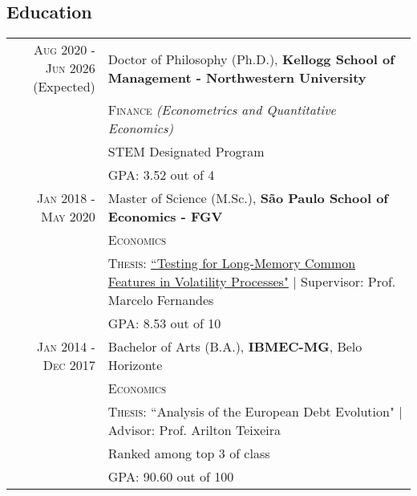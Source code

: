 \documentclass[a4paper,10pt]{article}
\begin{document}
\begin{samepage}
    \section{Education}
    \begin{tabular}{r|p{10.75cm}}
        \textsc{Aug} 2020 - \parbox[t]{1.5cm}{\centering \textsc{Jun} 2026\\ (Expected)} & Doctor of Philosophy (Ph.D.), \normalsize\textbf{Kellogg School of Management - Northwestern University} \\
        & \textsc{Finance} \textit{(Econometrics and Quantitative Economics)} \\
        & \normalsize \textsc{STEM} Designated Program \\
        & \normalsize \textsc{GPA}: 3.52 out of 4 \\
        \textsc{Jan} 2018 - \textsc{May} 2020 & Master of Science (M.Sc.), \normalsize\textbf{São Paulo School of Economics - FGV} \\
        & \textsc{Economics} \\
        & \normalsize \textsc{Thesis}: \href{http://hdl.handle.net/10438/29188}{``Testing for Long-Memory Common Features in Volatility Processes"} | \small Supervisor: Prof. Marcelo Fernandes \\
        &\normalsize \textsc{GPA}: 8.53 out of 10
        \\
        \textsc{Jan} 2014 - \textsc{Dec} 2017& Bachelor of Arts (B.A.), \normalsize\textbf{IBMEC-MG}, Belo Horizonte \\
        & \textsc{Economics} \\
        & \normalsize \textsc{Thesis}: ``Analysis of the European Debt Evolution" | \small Advisor: Prof. Arilton Teixeira \\
        & \normalsize{Ranked among top 3 of class} \\
        &\normalsize \textsc{GPA}: 90.60 out of 100
    \end{tabular}



\end{samepage}
\end{document}
